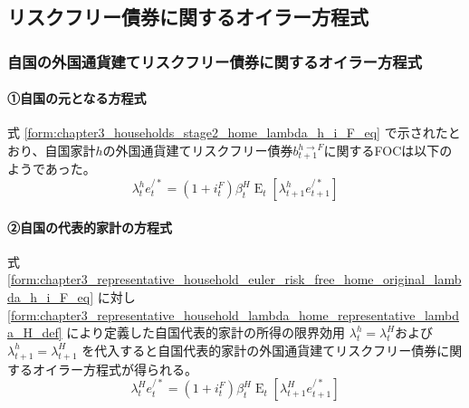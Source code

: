 
\subsection{リスクフリー債券に関するオイラー方程式}
\label{sec:chapter3_representative_household_euler_risk_free}

\subsubsection{自国の外国通貨建てリスクフリー債券に関するオイラー方程式}
\label{sec:chapter3_representative_household_euler_risk_free_home}

\paragraph{①自国の元となる方程式}
\label{sec:chapter3_representative_household_euler_risk_free_home_original}
式
\eqref{form:chapter3_households_stage2_home_lambda_h_i_F_eq}
で示されたとおり、自国家計\(h\)の外国通貨建てリスクフリー債券\(b_{t+1}^{h\to F}\)に関するFOCは以下のようであった。
\begin{equation}
\label{form:chapter3_representative_household_euler_risk_free_home_original_lambda_h_i_F_eq}
    \lambda_t^he_t^{/*}=(1+i_t^F)\beta_t^H\operatorname{E}_t[\lambda_{t+1}^he_{t+1}^{/*}]
\end{equation}

\paragraph{②自国の代表的家計の方程式}
\label{sec:chapter3_representative_household_euler_risk_free_home_representative}
式
\eqref{form:chapter3_representative_household_euler_risk_free_home_original_lambda_h_i_F_eq}
に対し
\eqref{form:chapter3_representative_household_lambda_home_representative_lambda_H_def}
により定義した自国代表的家計の所得の限界効用
\(\lambda_t^h=\lambda_t^H\)および
\(\lambda_{t+1}^h=\lambda_{t+1}^H\)
を代入すると自国代表的家計の外国通貨建てリスクフリー債券に関するオイラー方程式が得られる。
\begin{equation}
\label{form:chapter3_representative_household_euler_risk_free_home_representative_lambda_H_i_F_eq}
    \lambda_t^He_t^{/*}=(1+i_t^F)\beta_t^H\operatorname{E}_t[\lambda_{t+1}^He_{t+1}^{/*}]
\end{equation}

